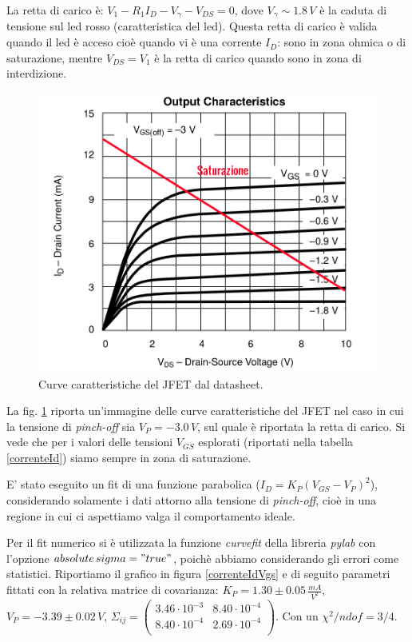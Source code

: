 \documentclass[10pt,a4paper]{article}
\begin{document}
La retta di carico è: $V_1 - R_1 I_D-V_{\gamma}-V_{DS} = 0$, dove $V_{\gamma} \sim 1.8 \, V$ è la caduta di tensione sul led rosso (caratteristica del led). Questa retta di carico è valida quando il led è acceso cioè quando vi è una corrente $I_D$: sono in zona ohmica o di saturazione, mentre $V_{DS} = V_1$ è la retta di carico quando sono in zona di interdizione.\\

\begin{figure}
\centering
\includegraphics[scale=0.4]{char2.png}
\caption{Curve caratteristiche del JFET dal datasheet.\label{curveCaratteristiche}}
\end{figure}

La fig. \ref{curveCaratteristiche} riporta un'immagine delle curve caratteristiche del JFET nel caso in cui la tensione di \emph{pinch-off} sia $V_P = -3.0\,V$, sul quale è riportata la retta di carico. Si vede che per i valori delle tensioni $V_{GS}$ esplorati (riportati nella tabella \ref{correnteId}) siamo sempre in zona di saturazione. 

E' stato eseguito un fit di una funzione parabolica ($I_D = K_P (V_{GS} - V_P)^2$), considerando solamente i dati attorno alla tensione di \emph{pinch-off}, cioè in una regione in cui ci aspettiamo valga il comportamento ideale. 

Per il fit numerico si è utilizzata la funzione \emph{curvefit} della libreria \emph{pylab} con l'opzione \emph{$absolute\,sigma = "true"$}, poichè abbiamo considerando gli errori come statistici. Riportiamo il grafico in figura \ref{correnteIdVgs} e di seguito parametri fittati con la relativa matrice di covarianza: $K_P = 1.30 \pm 0.05 \, \frac{mA}{V^2}$, $V_P = -3.39 \pm 0.02 \, V$,  $ \Sigma_{ij} = \left( \begin{array}{cc}
3.46 \cdot 10^{-3} & 8.40 \cdot 10^{-4} \\ 
8.40 \cdot 10^{-4} & 2.69 \cdot 10^{-4}\\
\end{array} \right)$. Con un $\chi^2/ndof = 3/4$.
\end{document}
